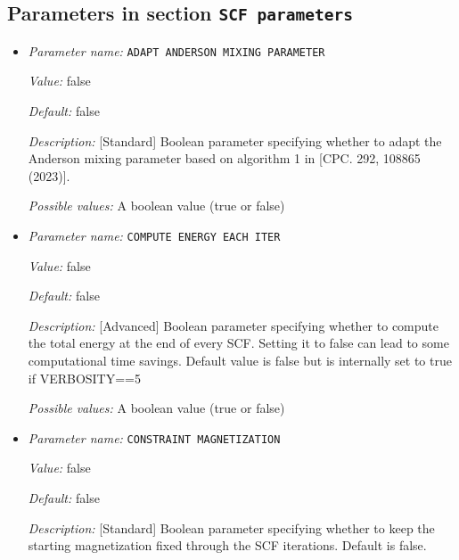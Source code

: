 \subsection{Parameters in section \tt SCF parameters}
\label{parameters:SCF_20parameters}

\begin{itemize}
\item {\it Parameter name:} {\tt ADAPT ANDERSON MIXING PARAMETER}
\label{parameters:SCF parameters/ADAPT ANDERSON MIXING PARAMETER}
\label{parameters:SCF_20parameters/ADAPT_20ANDERSON_20MIXING_20PARAMETER}


{\it Value:} false


{\it Default:} false


{\it Description:} [Standard] Boolean parameter specifying whether to adapt the Anderson mixing parameter based on algorithm 1 in [CPC. 292, 108865 (2023)].


{\it Possible values:} A boolean value (true or false)
\item {\it Parameter name:} {\tt COMPUTE ENERGY EACH ITER}
\label{parameters:SCF parameters/COMPUTE ENERGY EACH ITER}
\label{parameters:SCF_20parameters/COMPUTE_20ENERGY_20EACH_20ITER}


{\it Value:} false


{\it Default:} false


{\it Description:} [Advanced] Boolean parameter specifying whether to compute the total energy at the end of every SCF. Setting it to false can lead to some computational time savings. Default value is false but is internally set to true if VERBOSITY==5


{\it Possible values:} A boolean value (true or false)
\item {\it Parameter name:} {\tt CONSTRAINT MAGNETIZATION}
\label{parameters:SCF parameters/CONSTRAINT MAGNETIZATION}
\label{parameters:SCF_20parameters/CONSTRAINT_20MAGNETIZATION}


{\it Value:} false


{\it Default:} false


{\it Description:} [Standard] Boolean parameter specifying whether to keep the starting magnetization fixed through the SCF iterations. Default is false.



\end{itemize}
